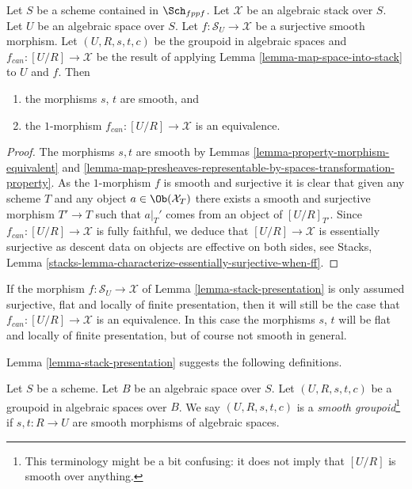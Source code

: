 \begin{lemma}
\label{lemma-stack-presentation}
Let $S$ be a scheme contained in $\Sch_{fppf}$.
Let $\mathcal{X}$ be an algebraic stack over $S$.
Let $U$ be an algebraic space over $S$.
Let $f : \mathcal{S}_U \to \mathcal{X}$ be a surjective smooth morphism.
Let $(U, R, s, t, c)$ be the groupoid in algebraic spaces
and $f_{can} : [U/R] \to \mathcal{X}$ be the result of applying
Lemma \ref{lemma-map-space-into-stack}
to $U$ and $f$. Then
\begin{enumerate}
\item the morphisms $s$, $t$ are smooth, and
\item the $1$-morphism $f_{can} : [U/R] \to \mathcal{X}$
is an equivalence.
\end{enumerate}
\end{lemma}

\begin{proof}
The morphisms $s, t$ are smooth by
Lemmas \ref{lemma-property-morphism-equivalent} and
\ref{lemma-map-presheaves-representable-by-spaces-transformation-property}.
As the $1$-morphism $f$ is smooth and
surjective it is clear that given any scheme $T$ and any object
$a \in \Ob(\mathcal{X}_T)$ there exists a smooth and surjective
morphism $T' \to T$ such that $a|_T'$ comes from an object of
$[U/R]_{T'}$. Since $f_{can} : [U/R] \to \mathcal{X}$
is fully faithful, we deduce that
$[U/R] \to \mathcal{X}$ is essentially surjective as
descent data on objects are effective on both sides, see
Stacks, Lemma \ref{stacks-lemma-characterize-essentially-surjective-when-ff}.
\end{proof}

\begin{remark}
\label{remark-flat-fp-presentation}
If the morphism $f : \mathcal{S}_U \to \mathcal{X}$ of
Lemma \ref{lemma-stack-presentation}
is only assumed surjective, flat and locally of finite presentation, then
it will still be the case that $f_{can} : [U/R] \to \mathcal{X}$ is an
equivalence. In this case the morphisms $s$, $t$ will be flat and
locally of finite presentation, but of course not smooth in general.
\end{remark}

\noindent
Lemma \ref{lemma-stack-presentation}
suggests the following definitions.

\begin{definition}
\label{definition-smooth-groupoid}
Let $S$ be a scheme. Let $B$ be an algebraic space over $S$.
Let $(U, R, s, t, c)$ be a groupoid in algebraic spaces over $B$.
We say $(U, R, s, t, c)$ is a {\it smooth groupoid}\footnote{This terminology
might be a bit confusing: it does not imply that $[U/R]$ is smooth
over anything.}
if $s, t : R \to U$ are smooth morphisms of algebraic spaces.
\end{definition}

